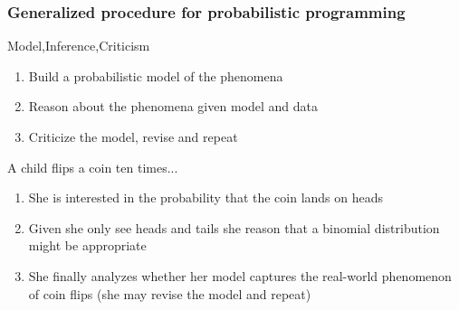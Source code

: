 \documentclass[table,dvipsnames]{beamer}
\begin{document}
\begin{frame}[fragile]
\frametitle{Generalized procedure for probabilistic programming}
\footnotesize
\begin{block}{Model,Inference,Criticism}
\begin{enumerate}
 \item Build a probabilistic model of the phenomena
 \item Reason about the phenomena given model and data
 \item Criticize the model, revise and repeat
\end{enumerate}
\end{block}

A child flips a coin ten times...
\begin{code}
[0, 1, 0, 0, 0, 0, 0, 0, 0, 1]
\end{code}

\begin{enumerate}
 \item She is interested in the probability that the coin lands on heads
 \item Given she only see heads and tails she reason that a binomial distribution might be appropriate
 \item She finally analyzes whether her model captures the real-world phenomenon of coin flips (she may revise the model
and repeat)
\end{enumerate}
\citep{Tran16}
\end{frame}

\end{document}
